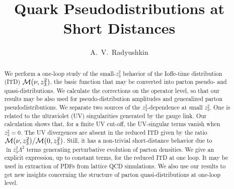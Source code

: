 \documentclass[final,5p,times,twocolumn]{elsarticle}
\begin{document}










\author{A.~V.~Radyushkin}
\address{Physics Department, Old Dominion University, Norfolk,
             VA 23529, USA}
\address{Thomas Jefferson National Accelerator Facility,
              Newport News, VA 23606, USA
}

   
                
                        
\title{Quark  Pseudodistributions  at Short Distances}
                        
         
                        
\begin{abstract}



We perform a   one-loop study  of  the small-$z_3^2$
behavior of the Ioffe-time distribution (ITD)  ${\cal M} (\nu, z_3^2)$,  
 the basic function that may be converted 
 into parton 
pseudo-  and quasi-distributions. 
We calculate the   corrections on   the 
operator level, so that our  results may be also 
used for pseudo-distribution amplitudes and 
generalized parton pseudodistributions. 
We 
separate  two sources of the $z_3^2$-dependence 
at small   $z_3^2$. One  is related to the 
ultraviolet (UV) singularities generated by the gauge  link.
Our calculation  shows that, for a finite UV cut-off, the  UV-singular terms 
vanish   when  $z_3^2=0$. The  UV divergences are  absent  
in the  reduced ITD given by the  ratio ${\cal M} (\nu, z_3^2)/{\cal M} (0, z_3^2)$.
Still, it  has a non-trivial short-distance 
behavior due to   $\ln z_3^2  \Lambda^2$   terms generating 
  perturbative evolution of  parton densities.
 We give an  explicit expression, up to constant terms, 
for  the reduced ITD at one loop.  It may  be used 
in   extraction  of  PDFs from  lattice QCD  simulations. 
We  also use our results to get  new insights concerning   the
 structure of parton quasi-distributions at one-loop  level. 





              
\end{abstract}
      
\end{document}
